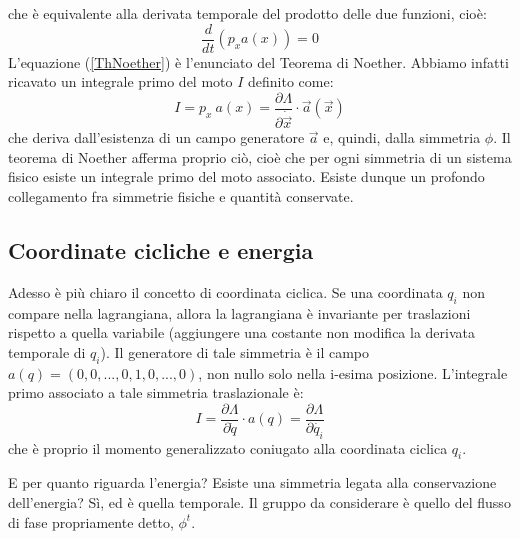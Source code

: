 \documentclass[a4paper,openany]{article}
\begin{document}
	che è equivalente alla derivata temporale del prodotto delle due funzioni, cioè:
	\begin{equation}\label{ThNoether}
		\dfrac{d}{dt}(p_x a(x)) = 0
	\end{equation}
	L'equazione (\ref{ThNoether}) è l'enunciato del Teorema di Noether. Abbiamo infatti ricavato un integrale primo del moto $I$ definito come:
	$$
	I = p_x \> a(x) = \dfrac{\partial \Lambda}{\partial \dot{\vec{x}}}\cdot\vec{a}(\vec{x})$$
	che deriva dall'esistenza di un campo generatore $\vec{a}$ e, quindi, dalla simmetria $\phi$. Il teorema di Noether afferma proprio ciò, cioè che per ogni simmetria di un sistema fisico esiste un integrale primo del moto associato. Esiste dunque un profondo collegamento fra simmetrie fisiche e quantità conservate.
	\subsection{Coordinate cicliche e energia}
	Adesso è più chiaro il concetto di coordinata ciclica. Se una coordinata $q_i$ non compare nella lagrangiana, allora la lagrangiana è invariante per traslazioni rispetto a quella variabile (aggiungere una costante non modifica la derivata temporale di $q_i$). Il generatore di tale simmetria è il campo $a(q) = (0,0, ..., 0, 1, 0, ..., 0)$, non nullo solo nella i-esima posizione. L'integrale primo associato a tale simmetria traslazionale è:
	$$
	I = \dfrac{\partial \Lambda}{\partial \dot{q}}\cdot a(q) = \dfrac{\partial \Lambda}{\partial \dot{q_i}}
	$$
	che è proprio il momento generalizzato coniugato alla coordinata ciclica $q_i$.
	
	E per quanto riguarda l'energia? Esiste una simmetria legata alla conservazione dell'energia? Sì, ed è quella temporale. Il gruppo da considerare è quello del flusso di fase propriamente detto, $\phi^{t}$.  
\end{document}
